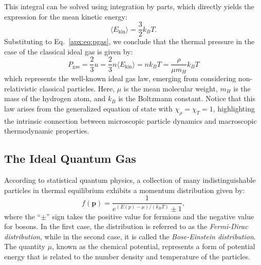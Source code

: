 \documentclass[main.tex]{subfiles}
\begin{document}
This integral can be solved using integration by parts, which directly yields the expression for the mean kinetic energy:
\begin{equation*}
    \langle E_\mathrm{kin} \rangle = \frac{3}{2}k_BT.
\end{equation*}
Substituting to Eq.~\eqref{apx:eq:pgas}, we conclude that the thermal pressure in the case of the classical ideal gas is given by:
\begin{equation}
    \boxed{P_{\text{gas}} = \frac{2}{3}u = \frac{2}{3} n \langle E_{\text{kin}} \rangle = nk_BT = \frac{\rho}{\mu m_H}k_BT}
\end{equation}
which represents the well-known ideal gas law, emerging from considering non-relativistic classical particles. Here, $\mu$ is the mean molecular weight, $m_H$ is the mass of the hydrogen atom, and $k_B$ is the Boltzmann constant.
Notice that this law arises from the generalized equation of state with $\chi_\rho = \chi_T = 1$, highlighting the intrinsic connection between microscopic particle dynamics and macroscopic thermodynamic properties.



\subsection{The Ideal Quantum Gas}

According to statistical quantum physics, a collection of many indistinguishable particles in thermal equilibrium exhibits a momentum distribution given by:
    \begin{equation}
    f(\boldsymbol{p}) = \frac{1}{e^{(E(p) - \mu) / (k_B T)} \pm 1},
    \end{equation}
where the ``$\pm$'' sign takes the positive value for fermions and the negative value for bosons. In the first case, the distribution is referred to as the \textit{Fermi-Dirac distribution}, while in the second case, it is called the \textit{Bose-Einstein distribution}. The quantity $\mu$, known as the chemical potential, represents a form of potential energy that is related to the number density and temperature of the particles.
\end{document}
